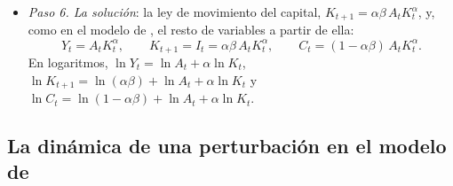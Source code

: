 \documentclass[11pt]{article}
\begin{document}
\begin{itemize}
\item \emph{Paso 6. La solución}: la ley de movimiento del capital, $K_{t+1}=\alpha\beta\,A_tK_t^{\alpha}$, y, como en el modelo de  , el resto de variables a partir de ella:
  \begin{equation*}
  Y_t=A_tK_t^{\alpha},\qquad K_{t+1}=I_t=\alpha\beta\,A_tK_t^{\alpha},\qquad C_t=(1-\alpha\beta)\,A_tK_t^{\alpha}.
  \end{equation*}
  En logaritmos, $\ln Y_t=\ln A_t+\alpha\ln K_t$, $\ln K_{t+1}=\ln(\alpha\beta)+\ln A_t+\alpha\ln K_t$ y $\ln C_t=\ln(1-\alpha\beta)+\ln A_t+\alpha\ln K_t$.
\end{itemize}

\subsection{La dinámica de una perturbación en el modelo de }
\end{document}

